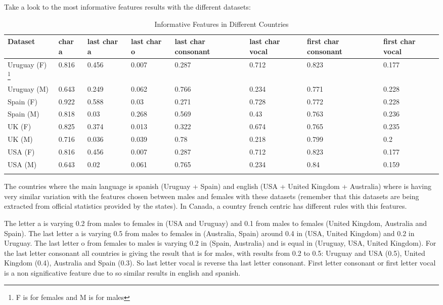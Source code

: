 \documentclass[fleqn,10pt]{wlpeerj} %
\begin{document}
Take a look to the most informative features results with the
different datasets:
\begin{longtable}[]{@{}llllllll@{}}
  \toprule
Dataset & char a & last char a & last char o & last char consonant & last char vocal & first char consonant & first char vocal & \tabularnewline
  \midrule
  \endhead
 Uruguay (F) \footnote{F is for females and M is for males} &    0.816 &         0.456 &         0.007 &                 0.287 &             0.712 &                  0.823 &              0.177 & \tabularnewline
 Uruguay (M) \footnotemark[3] &    0.643 &         0.249 &         0.062 &                 0.766 &             0.234 &                  0.771 &              0.228 & \tabularnewline
 Spain (F) \footnotemark[3]  &    0.922 &         0.588 &          0.03 &                 0.271 &             0.728 &                  0.772 &              0.228 & \tabularnewline
 Spain (M) \footnotemark[3]  &    0.818 &          0.03 &         0.268 &                 0.569 &              0.43 &                  0.763 &              0.236 & \tabularnewline
 UK (F) \footnotemark[3]     &    0.825 &         0.374 &         0.013 &                 0.322 &             0.674 &                  0.765 &              0.235 & \tabularnewline
 UK (M) \footnotemark[3]     &    0.716 &         0.036 &         0.039 &                  0.78 &             0.218 &                  0.799 &                0.2 & \tabularnewline
 USA (F) \footnotemark[3]    &    0.816 &         0.456 &         0.007 &                 0.287 &             0.712 &                  0.823 &              0.177 & \tabularnewline
 USA (M) \footnotemark[3]    &    0.643 &          0.02 &         0.061 &                 0.765 &             0.234 &                   0.84 &              0.159 & \tabularnewline
\bottomrule
\caption{Informative Features in Different Countries}
\label{table:InfoFeatures}
\end{longtable}

The countries where the main language is spanish (Uruguay + Spain) and
english (USA + United Kingdom + Australia) where is having very
similar variation with the features chosen between males and females
with these datasets (remember that this datasets are being extracted
from official statistics provided by the states). In Canada, a country
french centric has different rules with this features.

The letter a is varying 0.2 from males to females in (USA and Uruguay)
and 0.1 from males to females (United Kingdom, Australia and
Spain). The last letter a is varying 0.5 from males to females in
(Australia, Spain) around 0.4 in (USA, United Kingdom) and 0.2 in
Uruguay. The last letter o from females to males is varying 0.2 in
(Spain, Australia) and is equal in (Uruguay, USA, United Kingdom). For
the last letter consonant all countries is giving the result that is
for males, with results from 0.2 to 0.5: Uruguay and USA (0.5), United
Kingdom (0.4), Australia and Spain (0.3). So last letter vocal is
reverse tha last letter consonant. First letter consonant or first
letter vocal is a non significative feature due to so similar results
in english and spanish.
\end{document}
